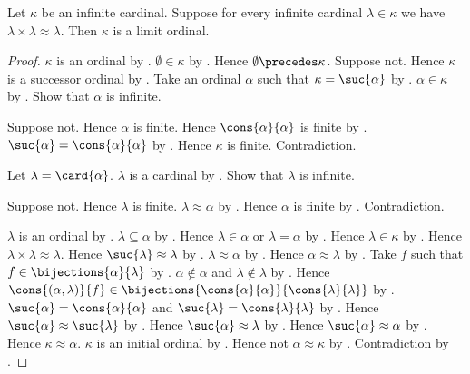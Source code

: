\begin{proposition}\label{infinite_cardinal_limit_from_smaller_squares}
    Let $\kappa$ be an infinite cardinal.
    Suppose for every infinite cardinal $\lambda\in\kappa$ we have
        $\lambda\times\lambda\approx\lambda$.
    Then $\kappa$ is a limit ordinal.
\end{proposition}
\begin{proof}
    $\kappa$ is an ordinal by .
    $\emptyset\in\kappa$ by .
    Hence $\emptyset\precedes\kappa$.
    Suppose not.
    Hence $\kappa$ is a successor ordinal
        by .
    Take an ordinal $\alpha$ such that $\kappa=\suc{\alpha}$
        by .
    $\alpha\in\kappa$ by .
    Show that $\alpha$ is infinite.
    \begin{subproof}
        Suppose not.
        Hence $\alpha$ is finite.
        Hence $\cons{\alpha}{\alpha}$ is finite by .
        $\suc{\alpha}=\cons{\alpha}{\alpha}$ by .
        Hence $\kappa$ is finite.
        Contradiction.
    \end{subproof}
    Let $\lambda=\card{\alpha}$.
    $\lambda$ is a cardinal by .
    Show that $\lambda$ is infinite.
    \begin{subproof}
        Suppose not.
        Hence $\lambda$ is finite.
        $\lambda\approx\alpha$ by .
        Hence $\alpha$ is finite by .
        Contradiction.
    \end{subproof}
    $\lambda$ is an ordinal by .
    $\lambda\subseteq\alpha$
        by .
    Hence $\lambda\in\alpha$ or $\lambda=\alpha$
        by .
    Hence $\lambda\in\kappa$ by .
    Hence $\lambda\times\lambda\approx\lambda$.
    Hence $\suc{\lambda}\approx\lambda$
        by .
    $\lambda\approx\alpha$ by .
    Hence $\alpha\approx\lambda$ by .
    Take $f$ such that $f\in\bijections{\alpha}{\lambda}$
        by .
    $\alpha\notin\alpha$ and $\lambda\notin\lambda$
        by .
    Hence $\cons{(\alpha,\lambda)}{f}
        \in\bijections{\cons{\alpha}{\alpha}}{\cons{\lambda}{\lambda}}$
        by .
    $\suc{\alpha}=\cons{\alpha}{\alpha}$ and
        $\suc{\lambda}=\cons{\lambda}{\lambda}$
        by .
    Hence $\suc{\alpha}\approx\suc{\lambda}$ by .
    Hence $\suc{\alpha}\approx\lambda$ by .
    Hence $\suc{\alpha}\approx\alpha$ by .
    Hence $\kappa\approx\alpha$.
    $\kappa$ is an initial ordinal by .
    Hence not $\alpha\approx\kappa$ by .
    Contradiction by .
\end{proof}

